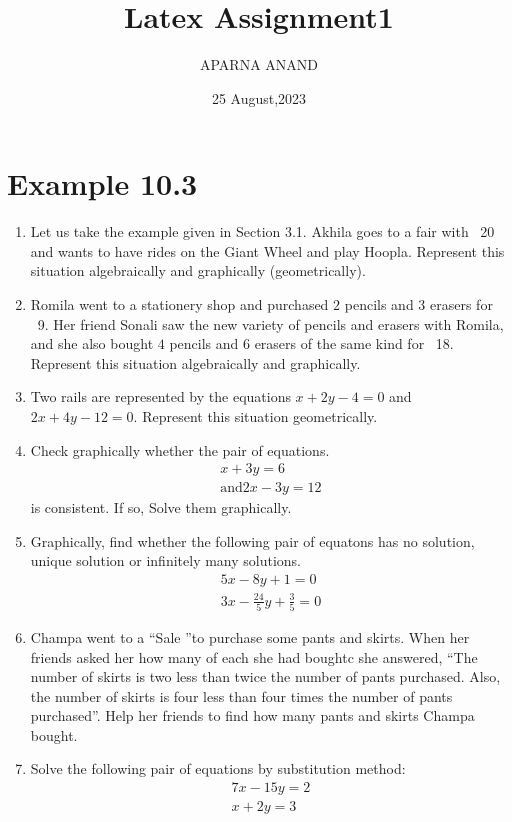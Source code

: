 \documentclass{article}
\theoremstyle{remark}
\begin{document}
\title{Latex Assignment1}
\author{APARNA ANAND}
\date{25 August,2023}
\maketitle
\section*{Example 10.3}
\begin{enumerate}
\item Let us take the example given in Section 3.1. Akhila goes to a fair with \rupee~20 and wants to have rides on the Giant Wheel and play Hoopla. Represent this situation algebraically and graphically (geometrically).
\item Romila went to a stationery shop and purchased $2$ pencils and $3$ erasers for \rupee~9. Her friend Sonali saw the new variety of pencils and erasers with Romila, and she also bought $4$ pencils and $6$ erasers of the same kind for \rupee~18. Represent this situation algebraically and graphically.
\item Two rails are represented by the equations $x+2y-4=0$ and $2x+4y-12=0$. Represent this situation geometrically.
\item Check graphically whether the pair of equations.
\begin{align}
x+3y = 6 \\ \text{and} 2x-3y = 12
\end{align}
is consistent. If so, Solve them graphically.
\item Graphically, find whether the following pair of equatons has no solution, unique solution or infinitely many solutions.
\begin{align}
5x-8y+1 = 0 \\ 3x-\frac{24}{5}y+\frac{3}{5} = 0
\end{align}
\item Champa went to a \textquotedblleft Sale \textquotedblright to purchase some pants and skirts. When her friends asked her how many of each she had boughtc she answered, \textquotedblleft The number of skirts is two less than twice the number of pants purchased. Also, the number of skirts is four less than four times the number of pants purchased\textquotedblright. Help her friends to find how many pants and skirts Champa bought.
\item Solve the following pair of equations by substitution method:
\begin{align}
7x-15y = 2 \\  x+2y = 3

\end{align}
\end{enumerate}
\end{document}
